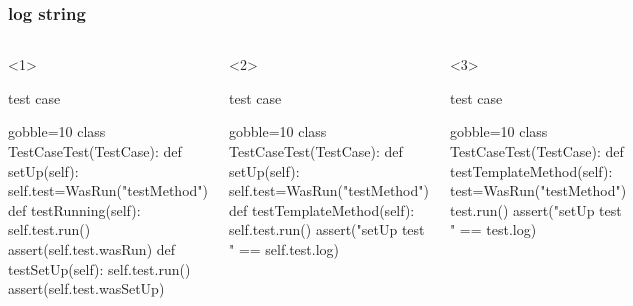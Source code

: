\documentclass[lualatex]{beamer}
\begin{document}
\begin{frame}[fragile,t]
  \frametitle{log string}

  \begin{columns}[t]
    \small
    \begin{onlyenv}<1>
      \begin{block}{test case}
        \begin{pythoncode*}{gobble=10}
          class TestCaseTest(TestCase):
            def setUp(self):
              self.test=WasRun("testMethod")
            def testRunning(self):
              self.test.run()
              assert(self.test.wasRun)
            def testSetUp(self):
              self.test.run()
              assert(self.test.wasSetUp)
        \end{pythoncode*}
      \end{block}
    \end{onlyenv}
    \begin{onlyenv}<2>
      \begin{block}{test case}
        \begin{pythoncode*}{gobble=10}
          class TestCaseTest(TestCase):
            def setUp(self):
              self.test=WasRun("testMethod")
            def testTemplateMethod(self):
              self.test.run()
              assert("setUp test "
                == self.test.log)
        \end{pythoncode*}
      \end{block}
    \end{onlyenv}
    \begin{onlyenv}<3>
      \begin{block}{test case}
        \begin{pythoncode*}{gobble=10}
          class TestCaseTest(TestCase):
            def testTemplateMethod(self):
              test=WasRun("testMethod")
              test.run()
              assert("setUp test "
                == test.log)
        \end{pythoncode*}
      \end{block}
    \end{onlyenv}


\end{columns}
\end{frame}
\end{document}
